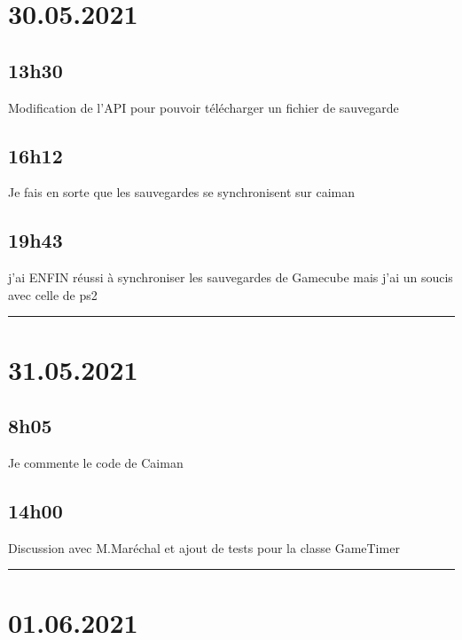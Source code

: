 \documentclass[a4paper,12pt,french]{sphinxmanual}
\begin{document}
\section{30.05.2021}
\label{\detokenize{logbook:id173}}

\subsection{13h30}
\label{\detokenize{logbook:id174}}
\sphinxAtStartPar
Modification de l’API pour pouvoir télécharger un fichier de sauvegarde


\subsection{16h12}
\label{\detokenize{logbook:h12}}
\sphinxAtStartPar
Je fais en sorte que les sauvegardes se synchronisent sur caiman


\subsection{19h43}
\label{\detokenize{logbook:h43}}
\sphinxAtStartPar
j’ai ENFIN réussi à synchroniser les sauvegardes de Gamecube mais j’ai un soucis avec celle de ps2


\bigskip\hrule\bigskip



\section{31.05.2021}
\label{\detokenize{logbook:id175}}

\subsection{8h05}
\label{\detokenize{logbook:id176}}
\sphinxAtStartPar
Je commente le code de Caiman


\subsection{14h00}
\label{\detokenize{logbook:id177}}
\sphinxAtStartPar
Discussion avec M.Maréchal et ajout de tests pour la classe GameTimer


\bigskip\hrule\bigskip



\section{01.06.2021}
\label{\detokenize{logbook:id178}}
\end{document}
